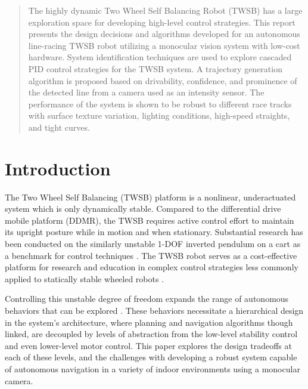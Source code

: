     \uomdeclarations

    \begin{abstract} %
        The highly dynamic Two Wheel Self Balancing Robot 
        (TWSB) has a large exploration space for developing high-level 
        control strategies. 
        This report presents the design decisions and algorithms developed for
        an autonomous line-racing TWSB robot utilizing a monocular vision system with low-cost hardware. 
        System identification techniques are used to explore
        cascaded PID control strategies for the TWSB system.
        A trajectory generation algorithm is proposed based on drivability, confidence, 
        and prominence of the detected line from a camera used as an intensity sensor. 
        The performance of the system is shown to be robust to different race tracks with
        surface texture variation, lighting conditions, high-speed straights, and tight curves. 
  \end{abstract}%
  \clearpage

    \section{Introduction}
    The Two Wheel Self Balancing (TWSB) platform is a nonlinear, underactuated system which is only dynamically stable.
    Compared to the differential drive mobile platform (DDMR), the TWSB requires active control effort
    to maintain its upright posture while in motion and when stationary.
    Substantial research has been conducted on the similarly unstable 1-DOF inverted pendulum on a cart 
    as a benchmark for control techniques \cite{boubaker2013inverted}. 
    The TWSB robot serves as a cost-effective platform for research and education in complex control 
    strategies less commonly applied to statically stable wheeled robots \cite{educationPlatform}.

    Controlling this unstable degree of freedom expands the range of autonomous behaviors that 
    can be explored \cite{RoboLimbo} \cite{jeong2008wheeled} \cite{Browning2004TurningSI}. 
    These behaviors necessitate a hierarchical design in the system's architecture,
    where planning and navigation algorithms though linked, are decoupled by levels of abstraction 
    from the low-level stability control and even lower-level motor control. This paper explores 
    the design tradeoffs at each of these levels, and the challenges with developing a robust system 
    capable of autonomous navigation in a variety of indoor environments using a monocular camera.

